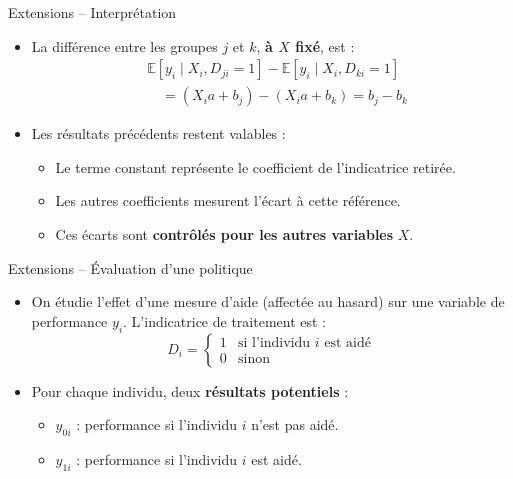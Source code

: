 \documentclass[11pt,aspectratio=169]{beamer}
\newcommand{\E}{\mathbb{E}}
\begin{document}
\begin{frame}{Extensions -- Interprétation}

\begin{itemize}

\item La différence entre les groupes $j$ et $k$, \textbf{à $X$ fixé}, est :
  \begin{align*}
      &\E[y_i \mid X_i, D_{ji} = 1] - \E[y_i \mid X_i, D_{ki} = 1] \\
      &\quad = (X_i a + b_j) - (X_i a + b_k) = b_j - b_k
  \end{align*}\newline

\item Les résultats précédents restent valables :
  \begin{itemize}
  \item Le terme constant représente le coefficient de l'indicatrice retirée.
  \item Les autres coefficients mesurent l'écart à cette référence.
  \item Ces écarts sont \textbf{contrôlés pour les autres variables} $X$.
  \end{itemize}

\end{itemize}

\end{frame}

\begin{frame}{Extensions -- Évaluation d'une politique}

\begin{itemize}

\item On étudie l'effet d'une mesure d'aide (affectée au hasard) sur une variable de performance $y_i$. L'indicatrice de traitement est :
  \[
  D_i = \begin{cases}
      1 & \text{si l'individu } i \text{ est aidé} \\
      0 & \text{sinon}
  \end{cases}
  \]\newline

\item Pour chaque individu, deux \textbf{résultats potentiels} :
  \begin{itemize}
  \item $y_{0i}$ : performance si l'individu $i$ n'est pas aidé.
  \item $y_{1i}$ : performance si l'individu $i$ est aidé.
  \end{itemize}

\end{itemize}

\end{frame}
\end{document}
